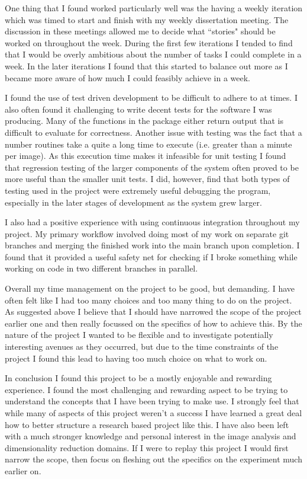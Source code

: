 One thing that I found worked particularly well was the having a weekly iteration which was timed to start and finish with my weekly dissertation meeting. The discussion in these meetings allowed me to decide what ``stories" should be worked on throughout the week. During the first few iterations I tended to find that I would be overly ambitious about the number of tasks I could complete in a week. In the later iterations I found that this started to balance out more as I became more aware of how much I could feasibly achieve in a week.

I found the use of test driven development to be difficult to adhere to at times. I also often found it challenging to write decent tests for the software I was producing. Many of the functions in the package either return output that is difficult to evaluate for correctness. Another issue with testing was the fact that a number routines take a quite a long time to execute (i.e. greater than a minute per image). As this execution time makes it infeasible for unit testing I found that regression testing of the larger components of the system often proved to be more useful than the smaller unit tests. I did, however, find that both types of testing used in the project were extremely useful debugging the program, especially in the later stages of development as the system grew larger. 

I also had a positive experience with using continuous integration throughout my project. My primary workflow involved doing most of my work on separate git branches and merging the finished work into the main branch upon completion. I found that it provided a useful safety net for checking if I broke something while working on code in two different branches in parallel.

Overall my time management on the project to be good, but demanding. I have often felt like I had too many choices and too many thing to do on the project. As suggested above I believe that I should have narrowed the scope of the project earlier one and then really focussed on the specifics of how to achieve this. By the nature of the project I wanted to be flexible and to investigate potentially interesting avenues as they occurred, but due to the time constraints of the project I found this lead to having too much choice on what to work on.

In conclusion I found this project to be a mostly enjoyable and rewarding experience. I found the most challenging and rewarding aspect to be trying to understand the concepts that I have been trying to make use. I strongly feel that while many of aspects of this project weren't a success I have learned a great deal how to better structure a research based project like this. I have also been left with a much stronger knowledge and personal interest in the image analysis and dimensionality reduction domains. If I were to replay this project I would first narrow the scope, then focus on fleshing out the specifics on the experiment much earlier on.  


